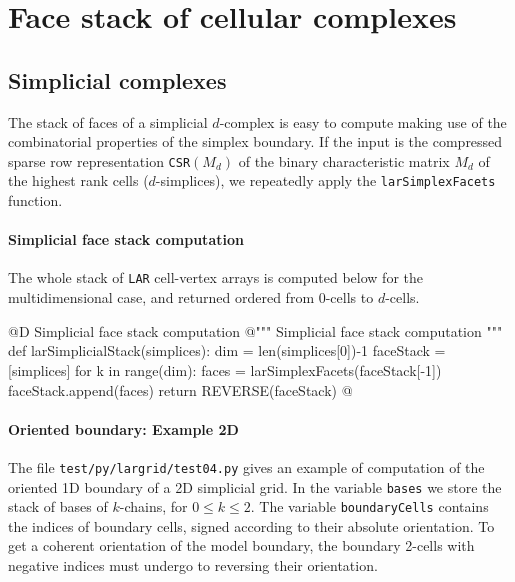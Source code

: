 \documentclass[11pt,oneside]{article}	%
\begin{document}
\section{Face stack of cellular complexes}
\label{sec:facestack}

\subsection{Simplicial complexes}

The stack of faces of a simplicial $d$-complex is easy to compute making use of the combinatorial properties of the simplex boundary. If the input is the compressed sparse row representation \texttt{CSR}$(M_d)$ of the binary characteristic matrix $M_d$ of the highest rank cells ($d$-simplices), we repeatedly apply the \texttt{larSimplexFacets} function.

\paragraph{Simplicial face stack computation}
The whole stack of \texttt{LAR} cell-vertex arrays is computed below for the multidimensional case, and returned ordered from 0-cells to $d$-cells.

@D Simplicial face stack computation
@{""" Simplicial face stack computation """
def larSimplicialStack(simplices):
	dim = len(simplices[0])-1
	faceStack = [simplices]
	for k in range(dim):
		faces = larSimplexFacets(faceStack[-1])
		faceStack.append(faces)
	return REVERSE(faceStack)
@}

\paragraph{Oriented boundary: Example 2D}
The file \texttt{test/py/largrid/test04.py} gives an example of computation of the oriented 1D boundary of a 2D simplicial grid. In the variable \texttt{bases} we store the stack of bases of $k$-chains, for $0\leq k\leq 2$. The variable \texttt{boundaryCells} contains the indices of boundary cells, signed according to their absolute orientation. To get a coherent orientation of the model boundary, the boundary 2-cells with negative indices must undergo to reversing their orientation.
 
\end{document}
